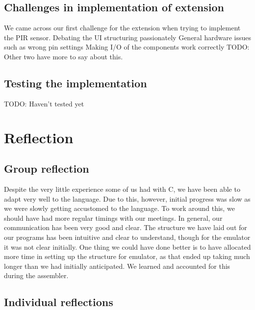 \documentclass[11pt]{article}
\begin{document}
\subsection{Challenges in implementation of extension}
We came across our first challenge for the extension when trying to implement the PIR sensor.
Debating the UI structuring passionately 
General hardware issues such as wrong pin settings
Making I/O of the components work correctly
TODO: Other two have more to say about this.

\subsection{Testing the implementation}
TODO: Haven't tested yet

\section{Reflection}

\subsection{Group reflection}
Despite the very little experience some of us had with C, we have been able to adapt very well to the language. Due to this, however, initial progress was slow as we were slowly getting accustomed to the language. To work around this, we should have had more regular timings with our meetings. In general, our communication has been very good and clear. The structure we have laid out for our programs has been intuitive and clear to understand, though for the emulator it was not clear initially. One thing we could have done better is to have allocated more time in setting up the structure for emulator, as that ended up taking much longer than we had initially anticipated. We learned and accounted for this during the assembler. 


\subsection{Individual reflections}
\end{document}
